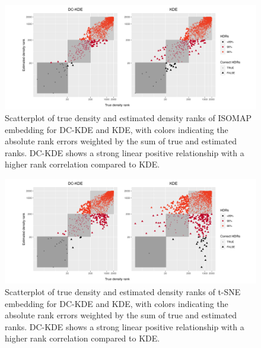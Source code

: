 \documentclass[11pt,a4paper,]{article}
\begin{document}
\begin{figure}

{\centering \includegraphics[width=1\linewidth]{figures/Twin Peak2000_densityrank_comparison_isomap_radius8_r0_5_logrank_rec_colprob_smallblocks3_crossfalse} 

}

\caption{Scatterplot of true density and estimated density ranks of ISOMAP embedding for DC-KDE and KDE, with colors indicating the absolute rank errors weighted by the sum of true and estimated ranks. DC-KDE shows a strong linear positive relationship with a higher rank correlation compared to KDE.}\label{fig:tpisomapden}
\end{figure}

\begin{figure}

{\centering \includegraphics[width=1\linewidth]{figures/Twin Peak2000_densityrank_comparison_tsne_radius8_r0_5_logrank_rec_colprob_smallblocks3_crossfalse} 

}

\caption{Scatterplot of true density and estimated density ranks of t-SNE embedding for DC-KDE and KDE, with colors indicating the absolute rank errors weighted by the sum of true and estimated ranks. DC-KDE shows a strong linear positive relationship with a higher rank correlation compared to KDE.}\label{fig:tptsneden}
\end{figure}
\end{document}
